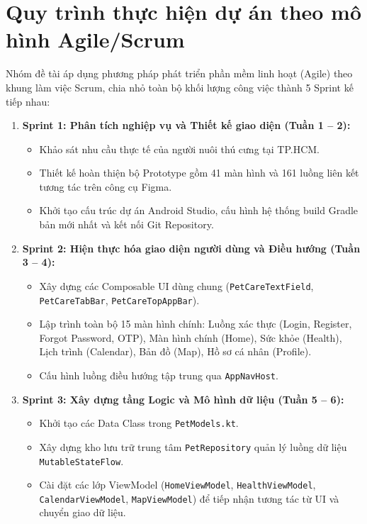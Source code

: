 \section{Quy trình thực hiện dự án theo mô hình Agile/Scrum}
\label{sec:quy_trinh_thuc_hien}

Nhóm đề tài áp dụng phương pháp phát triển phần mềm linh hoạt (Agile) theo khung làm việc Scrum, chia nhỏ toàn bộ khối lượng công việc thành 5 Sprint kế tiếp nhau:

\begin{enumerate}
    \item \textbf{Sprint 1: Phân tích nghiệp vụ và Thiết kế giao diện (Tuần 1 -- 2):}
    \begin{itemize}
        \item Khảo sát nhu cầu thực tế của người nuôi thú cưng tại TP.HCM.
        \item Thiết kế hoàn thiện bộ Prototype gồm 41 màn hình và 161 luồng liên kết tương tác trên công cụ Figma.
        \item Khởi tạo cấu trúc dự án Android Studio, cấu hình hệ thống build Gradle bản mới nhất và kết nối Git Repository.
    \end{itemize}

    \item \textbf{Sprint 2: Hiện thực hóa giao diện người dùng và Điều hướng (Tuần 3 -- 4):}
    \begin{itemize}
        \item Xây dựng các Composable UI dùng chung (\texttt{PetCareTextField}, \texttt{PetCareTabBar}, \texttt{PetCareTopAppBar}).
        \item Lập trình toàn bộ 15 màn hình chính: Luồng xác thực (Login, Register, Forgot Password, OTP), Màn hình chính (Home), Sức khỏe (Health), Lịch trình (Calendar), Bản đồ (Map), Hồ sơ cá nhân (Profile).
        \item Cấu hình luồng điều hướng tập trung qua \texttt{AppNavHost}.
    \end{itemize}

    \item \textbf{Sprint 3: Xây dựng tầng Logic và Mô hình dữ liệu (Tuần 5 -- 6):}
    \begin{itemize}
        \item Khởi tạo các Data Class trong \texttt{PetModels.kt}.
        \item Xây dựng kho lưu trữ trung tâm \texttt{PetRepository} quản lý luồng dữ liệu \texttt{MutableStateFlow}.
        \item Cài đặt các lớp ViewModel (\texttt{HomeViewModel}, \texttt{HealthViewModel}, \texttt{CalendarViewModel}, \texttt{MapViewModel}) để tiếp nhận tương tác từ UI và chuyển giao dữ liệu.
    \end{itemize}


\end{enumerate}
